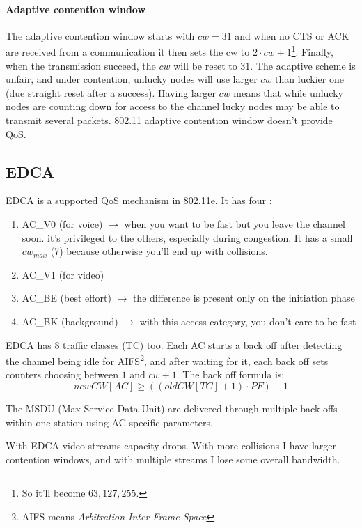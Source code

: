 \paragraph*{Adaptive contention window} The adaptive contention window starts
with $cw = 31$ and when no CTS or ACK are received from a communication it then
sets the cw to $2 \cdot cw + 1$\footnote{So it'll become $63, 127, 255$.}.
Finally, when the transmission succeed, the $cw$ will be reset to $31$.
The adaptive scheme is unfair, and under contention, unlucky nodes will use
larger $cw$ than luckier one (due straight reset after a success). Having larger
$cw$ means that while unlucky nodes are counting down for access to the channel
lucky nodes may be able to transmit several packets. 802.11 adaptive contention
window doesn't provide QoS.

\subsection{EDCA}

EDCA is a supported QoS mechanism in 802.11e. It has four
:
\begin{enumerate}
\item AC\_V0 (for voice) $\to$ when you want to be fast but you leave the
  channel soon. it's privileged to the others, especially during congestion.
  It has a small $cw_{max}$ (7) because otherwise you'll end up with collisions.
\item AC\_V1 (for video)
\item AC\_BE (best effort) $\to$ the difference is present only on the
  initiation phase
\item AC\_BK (background) $\to$ with this access category, you don't care to be
  fast
\end{enumerate}

EDCA has 8 traffic classes (TC) too.
Each AC starts a back off after detecting the channel being idle for
AIFS\footnote{AIFS means \textit{Arbitration Inter Frame Space}}, and
after waiting for it, each back off sets counters choosing between $1$ and
$cw + 1$. The back off formula is:
\begin{equation}
newCW[AC] \ge ((oldCW[TC] + 1) \cdot PF) - 1
\end{equation}

The MSDU (Max Service Data Unit) are delivered through multiple back offs
within one station using AC specific parameters.

With EDCA video streams capacity drops. With more collisions I have larger
contention windows, and with multiple streams I lose some overall bandwidth.

